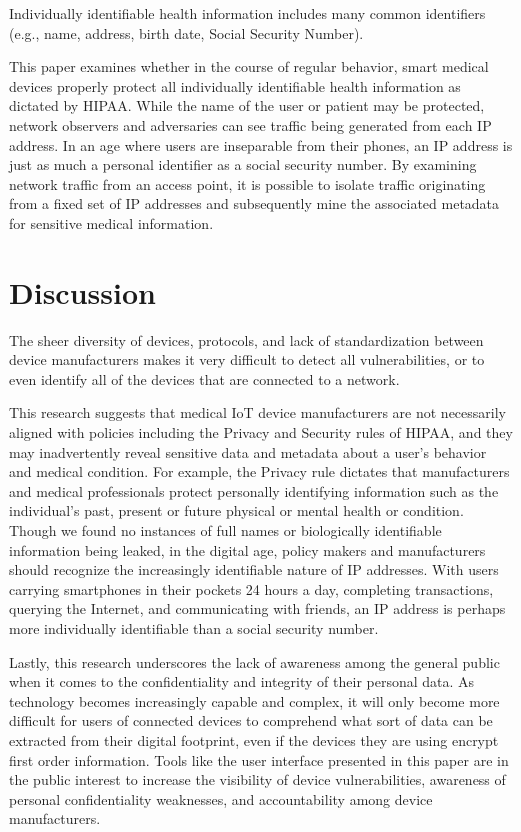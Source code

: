 Individually identifiable health information includes many common identifiers (e.g., name, address, birth date, Social Security Number).

This paper examines whether in the course of regular behavior, smart medical devices properly protect all individually identifiable health information as dictated by HIPAA. While the name of the user or patient may be protected, network observers and adversaries can see traffic being generated from each IP address. In an age where users are inseparable from their phones, an IP address is just as much a personal identifier as a social security number. By examining network traffic from an access point, it is possible to isolate traffic originating from a fixed set of IP addresses and subsequently mine the associated metadata for sensitive medical information. 



\section{Discussion}

The sheer diversity of devices, protocols, and lack of standardization between device manufacturers makes it very difficult to detect all vulnerabilities, or to even identify all of the devices that are connected to a network.

This research suggests that medical IoT device manufacturers are not necessarily aligned with policies including the Privacy and Security rules of HIPAA, and they may inadvertently reveal sensitive data and metadata about a user's behavior and medical condition. For example, the Privacy rule dictates that manufacturers and medical professionals protect personally identifying information such as the individual's past, present or future physical or mental health or condition. Though we found no instances of full names or biologically identifiable information being leaked, in the digital age, policy makers and manufacturers should recognize the increasingly identifiable nature of IP addresses. With users carrying smartphones in their pockets 24 hours a day, completing transactions, querying the Internet, and communicating with friends, an IP address is perhaps more individually identifiable than a social security number.

Lastly, this research underscores the lack of awareness among the general public when it comes to the confidentiality and integrity of their personal data. As technology becomes increasingly capable and complex, it will only become more difficult for users of connected devices to comprehend what sort of data can be extracted from their digital footprint, even if the devices they are using encrypt first order information. Tools like the user interface presented in this paper are in the public interest to increase the visibility of device vulnerabilities, awareness of personal confidentiality weaknesses, and accountability among device manufacturers.


